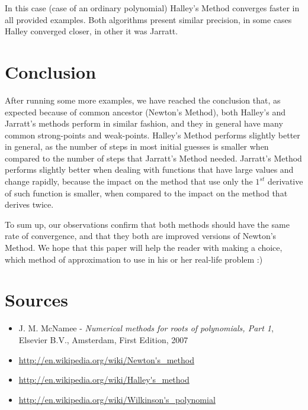 \documentclass{article}
\begin{document}
In this case (case of an ordinary polynomial) Halley's Method converges faster in all provided
examples. Both algorithms present similar precision, in some cases Halley converged closer, in other
it was Jarratt.



\section{Conclusion}

After running some more examples, we have reached the conclusion that, as expected because of common
ancestor (Newton's Method), both Halley's and Jarratt's methods perform in similar fashion, and they
in general have many common strong-points and weak-points. Halley's Method performs slightly better
in general, as the number of steps in most initial guesses is smaller when compared to the number of
steps that Jarratt's Method needed. Jarratt's Method performs slightly better when dealing with
functions that have large values and change rapidly, because the impact on the method that use only
the $1^{st}$ derivative of such function is smaller, when compared to the impact on the method that
derives twice.

To sum up, our observations confirm that both methods should have the same rate of convergence, and
that they both are improved versions of Newton's Method. We hope that this paper will help the
reader with making a choice, which method of approximation to use in his or her real-life problem :)

\section{Sources}

\begin{itemize}

	\item J. M. McNamee - \emph{Numerical methods for roots of polynomials, Part 1}, Elsevier B.V.,
	Amsterdam, First Edition, 2007
	
	\item \url{http://en.wikipedia.org/wiki/Newton's_method}
	
	\item \url{http://en.wikipedia.org/wiki/Halley's_method}
	
	\item \url{http://en.wikipedia.org/wiki/Wilkinson's_polynomial}

\end{itemize}
\end{document}
